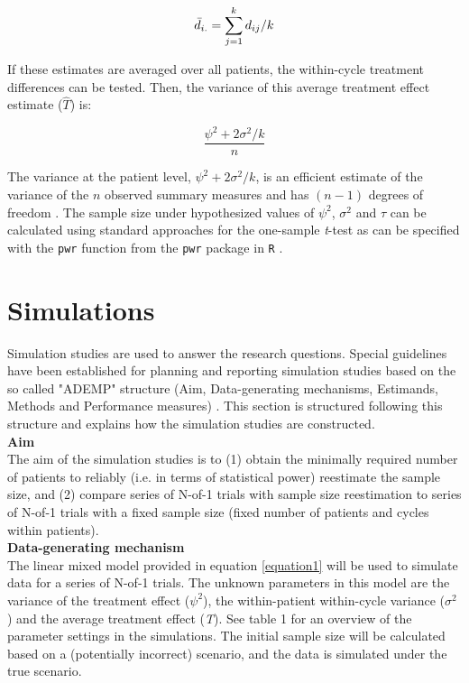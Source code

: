 \documentclass[11pt]{article}
\begin{document}
\begin{equation}
    \Bar{d}_{i.} = \sum_{j=1}^{k} d_{ij}/k \label{equation2}
\end{equation}

\noindent If these estimates are averaged over all patients, the within-cycle treatment differences can be tested. Then, the variance of this average treatment effect estimate ($\hat{T}$) is:

\begin{equation}
    \frac{\psi^2+2\sigma^2/k}{n} \label{equation3}
\end{equation}

\noindent The variance at the patient level, $\psi^2+2\sigma^2/k$, is an efficient estimate of the variance of the $n$ observed summary measures and has $(n-1)$ degrees of freedom \cite{senn2019}. The sample size under hypothesized values of $\psi^2$, $\sigma^2$ and $\tau$ can be calculated using standard approaches for the one-sample \textit{t}-test as can be specified with the \verb+pwr+ function from the \verb+pwr+ package \cite{champely2018} in \verb+R+ \cite{Rmanual}. 


\section{Simulations} \label{Simulations}
Simulation studies are used to answer the research questions. Special guidelines have been established for planning and reporting simulation studies based on the so called "ADEMP" structure (Aim, Data-generating mechanisms, Estimands, Methods and Performance measures) \cite{morris2019}. This section is structured following this structure and explains how the simulation studies are constructed.\\

\noindent \textbf{Aim} \\
\noindent The aim of the simulation studies is to (1) obtain the minimally required number of patients to reliably (i.e. in terms of statistical power) reestimate the sample size, and (2) compare series of N-of-1 trials with sample size reestimation to series of N-of-1 trials with a fixed sample size (fixed number of patients and cycles within patients).  \\

\noindent \textbf{Data-generating mechanism} \\
\noindent The linear mixed model provided in equation \eqref{equation1} will be used to simulate data for a series of N-of-1 trials. The unknown parameters in this model are the variance of the treatment effect ($\psi^2$), the within-patient within-cycle variance ($\sigma^2$) and the average treatment effect (\textit{T}). See table 1 for an overview of the parameter settings in the simulations. The initial sample size will be calculated based on a (potentially incorrect) scenario, and the data is simulated under the true scenario. 
\end{document}
